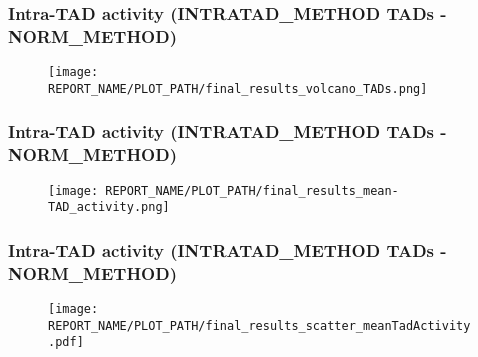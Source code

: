



\begin{frame}
\frametitle{Intra-TAD activity (INTRATAD_METHOD TADs - NORM_METHOD)}
\begin{figure}
\texttt{[image: REPORT\_NAME/PLOT\_PATH/final\_results\_volcano\_TADs.png]}
\end{figure}
\end{frame}


\begin{frame}
\frametitle{Intra-TAD activity (INTRATAD_METHOD TADs - NORM_METHOD)}
\begin{figure}
\texttt{[image: REPORT\_NAME/PLOT\_PATH/final\_results\_mean-TAD\_activity.png]}
\end{figure}
\end{frame}


\begin{frame}
\frametitle{Intra-TAD activity (INTRATAD_METHOD TADs - NORM_METHOD)}
\begin{figure}
\texttt{[image: REPORT\_NAME/PLOT\_PATH/final\_results\_scatter\_meanTadActivity.pdf]}
\end{figure}
\end{frame}
